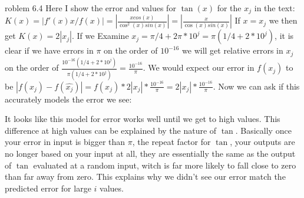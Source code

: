 \documentclass[12pt]{article}
\makeatletter
\theoremstyle{homework}
\newenvironment{exercise}[1]
{\def\@currentlabel{#1}\exercisecore}
{\endexercisecore}
\makeatother
\begin{document}
\begin{exercise}

Problem 6.4
\end{exercise}
Here I show the error and values for $\tan(x)$ for the $x_j$ in the text:\\

$K(x)=|f'(x)x/f(x)|=|\frac{xcos(x)}{\cos^2(x)sin(x)}|=|\frac{x}{\cos(x)sin(x)}|$ If $x=x_j$ we then get $K(x)=2|x_j|$.  If we Examine $x_j=\pi/4+2\pi*10^{j}=\pi(1/4+2*10^{j})$, it is clear if we have errors in $\pi$ on the order of $10^{-16}$ we will get relative errors in $x_j$ on the order of $\frac{10^{-16}(1/4+2*10^{j})}{\pi(1/4+2*10^{j})}=\frac{10^{-16}}{\pi}$.  We would expect our error in $f(x_j)$ to be $|f(x_j)-f(\hat{x_j})|=f(x_j)*2|x_j|*\frac{10^{-16}}{\pi}=2|x_j|*\frac{10^{-16}}{\pi}$.  Now we can ask if this accurately models the error we see:

It looks like this model for error works well until we get to high values.  This difference at high values can be explained by the nature of $\tan$.  Basically once your error in input is bigger than $\pi$, the repeat factor for $\tan$, your outputs are no longer based on your input at all, they are essentially the same as the output of $\tan$ evaluated at a random input, witch is far more likely to fall close to zero than far away from zero.  This explains why we didn't see our error match the predicted error for large $i$ values.
\end{document}
